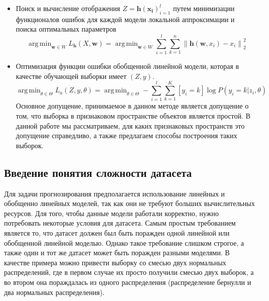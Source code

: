 \documentclass[a4paper,14pt]{extarticle}
\DeclareMathOperator*{\argmin}{arg\,min}
\numberwithin{equation}{section}
\begin{document}
\begin{itemize}
	\item Поиск и вычисление отображения $Z = {\mathbf{h(x_i)}}^l_{i=1}$ путем минимизации функционалов ошибок для каждой модели локальной аппроксимации и поиска оптимальных параметров
	\begin{equation}
	\argmin_{\mathbf{w} \in W} L_{\mathbf{h}}(X,\mathbf{w}) =  	\argmin_{\mathbf{w} \in W} \sum_{i=1}^{l}\sum_{k=1}^{n}\left\| \mathbf{h}(\mathbf{w},x_i)-x_i\right\|_2^2 
	\end{equation}
	\item Оптимизация функции ошибки обобщенной линейной модели, которая в качестве обучающей выборки имеет $(Z, y)$.
	\begin{equation*}
	\argmin_{\theta \in \Theta} L_a(Z,y,\theta) = \argmin_{\theta \in \Theta} -\sum_{i=1}^{l}\sum_{k=1}^K[y_i = k]\log P(y_i=k|z_i,\theta)
	\end{equation*}
	Основное допущение, принимаемое в данном методе является допущение о том, что выборка в признаковом пространстве объектов является простой. В данной работе мы рассматриваем, для каких признаковых пространств это допущение справедливо, а также предлагаем способы построения таких выборок.
	
\end{itemize}

\subsection*{Введение понятия сложности датасета}
Для задачи прогнозирования предполагается использование линейных и обобщенно линейных моделей, так как они не требуют больших вычислительных ресурсов. Для того, чтобы данные модели работали корректно, нужно потребовать некоторые условия для датасета. Самым простым требованием является то, что датасет должен был быть поражден одной линейной или обобщенной линейной моделью. Однако такое требование слишком строгое, а также один и тот же датасет может быть поражден разными моделями.  В качестве примера можно привести выборку со смесью двух нормальных распределений, где в первом случае их просто получили смесью двух выборок, а во втором она пораждалась из одного распределения (распределение бернулли и два нормальных распределения).
\end{document}
